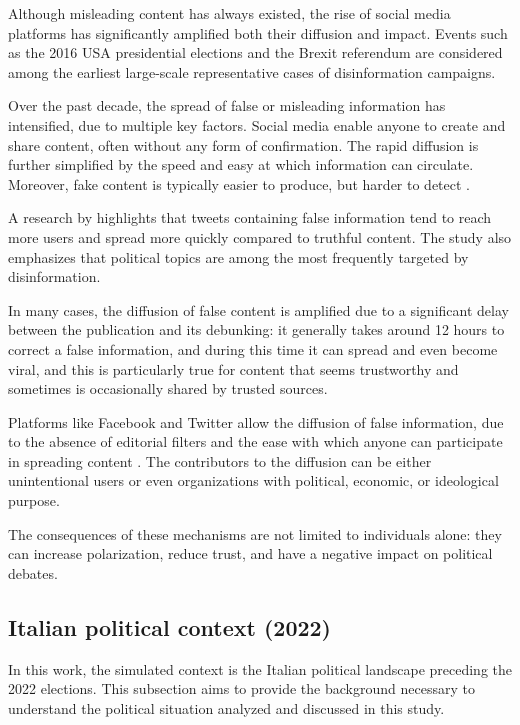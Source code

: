 Although misleading content has always existed, the rise of social media platforms has significantly amplified both their diffusion and impact. 
Events such as the 2016 USA presidential elections and the Brexit referendum are considered among the earliest large-scale representative cases of disinformation campaigns.

Over the past decade, the spread of false or misleading information has intensified, due to multiple key factors.
Social media enable anyone to create and share content, often without any form of confirmation. The rapid diffusion is further simplified by the speed and easy at which information can circulate.
Moreover, fake content is typically easier to produce, but harder to detect \cite{aimeur2023fake}. 

\medskip
A research by \citet{kumar2018falseinformationwebsocial} highlights that tweets containing false information tend to reach more users and spread more quickly compared to truthful content. The study also emphasizes that political topics are among the most frequently targeted by disinformation.

In many cases, the diffusion of false content is amplified due to a significant delay between the publication and its debunking: it generally takes around 12 hours to correct a false information, and during this time it can spread and even become viral, and this is particularly true for content that seems trustworthy and sometimes is occasionally shared by trusted sources.

\medskip
Platforms like Facebook and Twitter allow the diffusion of false information, due to the absence of editorial filters and the ease with which anyone can participate in spreading content \cite{hilary2021social}.
The contributors to the diffusion can be either unintentional users or even organizations with political, economic, or ideological purpose.

The consequences of these mechanisms are not limited to individuals alone: they can increase polarization, reduce trust, and have a negative impact on political debates.



\subsection{Italian political context (2022)}
In this work, the simulated context is the Italian political landscape preceding the 2022 elections.
This subsection aims to provide the background necessary to understand the political situation analyzed and discussed in this study.

